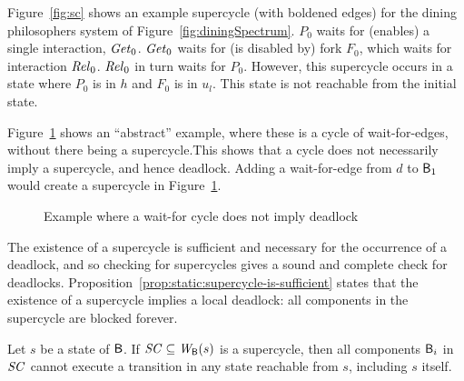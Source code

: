 Figure~\ref{fig:sc} shows an example supercycle (with boldened edges) for the dining philosophers
system of Figure~\ref{fig:diningSpectrum}.
$P_0$ waits for (enables) a single interaction, $\mathit{Get}_0$. 
$\mathit{Get}_0$ waits for (is disabled by) fork $F_0$, which waits for interaction $\mathit{Rel}_0$.
$\mathit{Rel}_0$ in turn waits for $P_0$. However, this supercycle occurs in a state where $P_0$ is in $h$
and $F_0$ is in $u_l$. This state is not reachable from the initial state. 



Figure~\ref{fig:cycleOK} shows an ``abstract'' example, where these is
a cycle of wait-for-edges, without there being a supercycle.This shows
that a cycle does not necessarily imply a supercycle, and hence
deadlock. Adding a wait-for-edge from $d$ to $\mathsf{B}_1$ would create a
supercycle in Figure~\ref{fig:cycleOK}.
%
\begin{figure}[ht]
\begin{center}
\scalebox{0.5}{}
\caption{Example where a wait-for cycle does not imply deadlock}
\label{fig:cycleOK}
\end{center}
\end{figure}






The existence of a supercycle is sufficient and necessary for the occurrence of
a deadlock, and so checking for supercycles gives a sound and complete check for
deadlocks.  
%
Proposition~\ref{prop:static:supercycle-is-sufficient} states that the
existence of a supercycle implies a local deadlock: all components in
the supercycle are blocked forever.

\bp
\label{prop:static:supercycle-is-sufficient}
Let $s$ be a state of $\mathsf{B}$.
If $\mathit{SC} \subseteq \mathit{W}_{\mathsf{B}}({s})$ is a supercycle, then all components $\mathsf{B}_i$ in $\mathit{SC}$ cannot execute a transition in any state reachable
from $s$, including $s$ itself.
\ep
%

